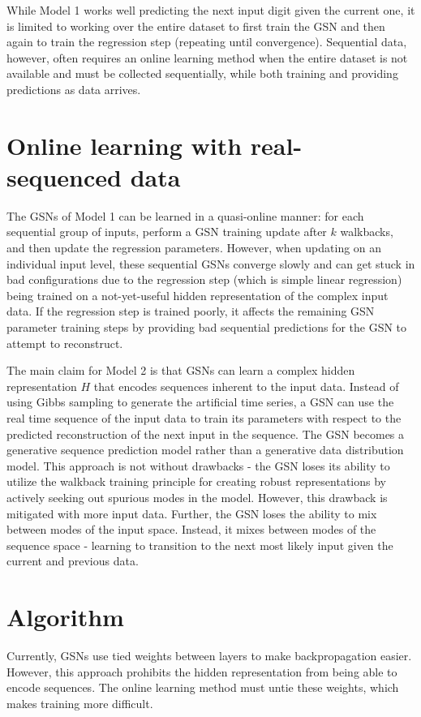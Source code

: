 While Model 1 works well predicting the next input digit given the current one, it is limited to working over the entire dataset to first train the GSN and then again to train the regression step (repeating until convergence). Sequential data, however, often requires an online learning method when the entire dataset is not available and must be collected sequentially, while both training and providing predictions as data arrives.

\section{Online learning with real-sequenced data }
The GSNs of Model 1 can be learned in a quasi-online manner: for each sequential group of inputs, perform a GSN training update after \(k\) walkbacks, and then update the regression parameters. However, when updating on an individual input level, these sequential GSNs converge slowly and can get stuck in bad configurations due to the regression step (which is simple linear regression) being trained on a not-yet-useful hidden representation of the complex input data. If the regression step is trained poorly, it affects the remaining GSN parameter training steps by providing bad sequential predictions for the GSN to attempt to reconstruct.

The main claim for Model 2 is that GSNs can learn a complex hidden representation \(H\) that encodes sequences inherent to the input data. Instead of using Gibbs sampling to generate the artificial time series, a GSN can use the real time sequence of the input data to train its parameters with respect to the predicted reconstruction of the next input in the sequence. The GSN becomes a generative sequence prediction model rather than a generative data distribution model. This approach is not without drawbacks - the GSN loses its ability to utilize the walkback training principle for creating robust representations by actively seeking out spurious modes in the model. However, this drawback is mitigated with more input data.  Further, the GSN loses the ability to mix between modes of the input space. Instead, it mixes between modes of the sequence space - learning to transition to the next most likely input given the current and previous data.


\section{Algorithm}

Currently, GSNs use tied weights between layers to make backpropagation easier. However, this approach prohibits the hidden representation from being able to encode sequences. The online learning method must untie these weights, which makes training more difficult.

